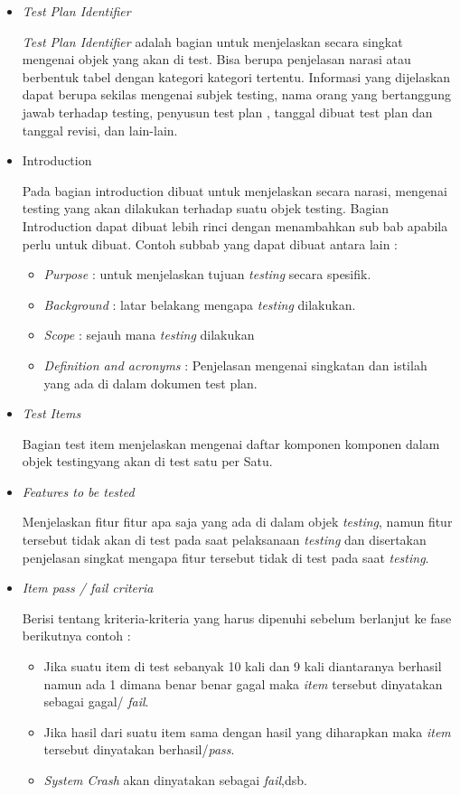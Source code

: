\begin{itemize}
	\itemsep0em
	\item \textit{Test Plan Identifier}
	\par \textit{Test Plan Identifier} adalah bagian untuk menjelaskan secara singkat mengenai objek yang akan di test. Bisa berupa penjelasan narasi atau berbentuk tabel dengan kategori kategori tertentu. Informasi yang dijelaskan dapat berupa sekilas mengenai subjek testing, nama orang yang bertanggung jawab terhadap testing, penyusun test plan , tanggal dibuat test plan dan tanggal revisi, dan lain-lain.
	
	\item Introduction
	\par Pada bagian introduction dibuat untuk menjelaskan secara narasi, mengenai testing yang akan dilakukan terhadap suatu objek testing. Bagian Introduction dapat dibuat lebih rinci dengan menambahkan sub bab apabila perlu untuk dibuat. Contoh subbab yang dapat dibuat antara lain :
	\begin{itemize}
		\itemsep0em
		\item \textit{Purpose} : untuk menjelaskan tujuan \textit{testing}  secara spesifik.
		\item \textit{Background} : latar belakang mengapa \textit{testing} dilakukan.
		\item \textit{Scope} : sejauh mana \textit{testing} dilakukan
		\item \textit{Definition and acronyms} : Penjelasan mengenai singkatan dan istilah yang ada di dalam dokumen test plan.
	\end{itemize}
	
	\item \textit{Test Items}
	\par Bagian test item menjelaskan mengenai daftar komponen komponen dalam objek testingyang akan di test satu per Satu.
	
	\item \textit{Features to be tested}
	\par Menjelaskan fitur fitur apa saja yang ada di dalam objek \textit{testing}, namun fitur tersebut tidak akan di test pada saat pelaksanaan \textit{testing} dan disertakan penjelasan singkat mengapa fitur tersebut tidak di test pada saat \textit{testing}.
	
	\item \textit{Item pass / fail criteria}
	\par Berisi tentang kriteria-kriteria yang harus dipenuhi sebelum berlanjut ke fase berikutnya contoh :
	\begin{itemize}
		\itemsep0em
		\item Jika suatu item di test sebanyak 10 kali dan 9 kali diantaranya berhasil namun ada 1 dimana benar benar gagal maka \textit{item} tersebut dinyatakan sebagai gagal/ \textit{fail}.
		\item Jika hasil dari suatu item sama dengan hasil yang diharapkan maka \textit{item} tersebut dinyatakan berhasil/\textit{pass}.
		\item \textit{System Crash} akan dinyatakan sebagai \textit{fail},dsb.
	\end{itemize}
	

\end{itemize}
